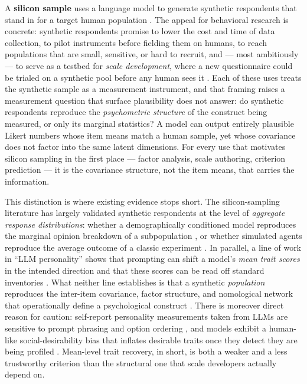 \documentclass[11pt]{article}
\begin{document}
A \textbf{silicon sample} uses a language model to generate synthetic respondents that stand in for a target human population \citep{argyle2023}. The appeal for behavioral research is concrete: synthetic respondents promise to lower the cost and time of data collection, to pilot instruments before fielding them on humans, to reach populations that are small, sensitive, or hard to recruit, and — most ambitiously — to serve as a testbed for \textit{scale development}, where a new questionnaire could be trialed on a synthetic pool before any human sees it \citep{grossmann2023,dillion2023}. Each of these uses treats the synthetic sample as a measurement instrument, and that framing raises a measurement question that surface plausibility does not answer: do synthetic respondents reproduce the \textit{psychometric structure} of the construct being measured, or only its marginal statistics? A model can output entirely plausible Likert numbers whose item means match a human sample, yet whose covariance does not factor into the same latent dimensions. For every use that motivates silicon sampling in the first place — factor analysis, scale authoring, criterion prediction — it is the covariance structure, not the item means, that carries the information.

This distinction is where existing evidence stops short. The silicon-sampling literature has largely validated synthetic respondents at the level of \textit{aggregate response distributions}: whether a demographically conditioned model reproduces the marginal opinion breakdown of a subpopulation \citep{argyle2023,santurkar2023}, or whether simulated agents reproduce the average outcome of a classic experiment \citep{aher2023}. In parallel, a line of work in ``LLM personality'' shows that prompting can shift a model's \textit{mean trait scores} in the intended direction and that these scores can be read off standard inventories \citep{serapiogarcia2023,jiang2023,miotto2022,pellert2024}. What neither line establishes is that a synthetic \textit{population} reproduces the inter-item covariance, factor structure, and nomological network that operationally define a psychological construct \citep{cronbachmeehl1955}. There is moreover direct reason for caution: self-report personality measurements taken from LLMs are sensitive to prompt phrasing and option ordering \citep{gupta2024}, and models exhibit a human-like social-desirability bias that inflates desirable traits once they detect they are being profiled \citep{salecha2024}. Mean-level trait recovery, in short, is both a weaker and a less trustworthy criterion than the structural one that scale developers actually depend on.
\end{document}
